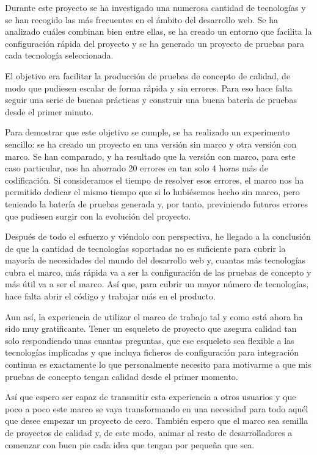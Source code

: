 Durante este proyecto se ha investigado una numerosa cantidad de tecnologías y se han recogido las más frecuentes en el ámbito del desarrollo web. Se ha analizado cuáles combinan bien entre ellas, se ha creado un entorno que facilita la configuración rápida del proyecto y se ha generado un proyecto de pruebas para cada tecnología seleccionada.

El objetivo era facilitar la producción de pruebas de concepto de calidad, de modo que pudiesen escalar de forma rápida y sin errores. Para eso hace falta seguir una serie de buenas prácticas y construir una buena batería de pruebas desde el primer minuto.

Para demostrar que este objetivo se cumple, se ha realizado un experimento sencillo: se ha creado un proyecto en una versión sin marco y otra versión con marco. Se han comparado, y ha resultado que la versión con marco, para este caso particular, nos ha ahorrado 20 errores en tan solo 4 horas más de codificación. Si consideramos el tiempo de resolver esos errores, el marco nos ha permitido dedicar el mismo tiempo que si lo hubiésemos hecho sin marco, pero teniendo la batería de pruebas generada y, por tanto, previniendo futuros errores que pudiesen surgir con la evolución del proyecto.

Después de todo el esfuerzo y viéndolo con perspectiva, he llegado a la conclusión de que la cantidad de tecnologías soportadas no es suficiente para cubrir la mayoría de necesidades del mundo del desarrollo web y, cuantas más tecnologías cubra el marco, más rápida va a ser la configuración de las pruebas de concepto y más útil va a ser el marco. Así que, para cubrir un mayor número de tecnologías, hace falta abrir el código y trabajar más en el producto.

Aun así, la experiencia de utilizar el marco de trabajo tal y como está ahora ha sido muy gratificante. Tener un esqueleto de proyecto que asegura calidad tan solo respondiendo unas cuantas preguntas, que ese esqueleto sea flexible a las tecnologías implicadas y que incluya ficheros de configuración para integración continua es exactamente lo que personalmente necesito para motivarme a que mis pruebas de concepto tengan calidad desde el primer momento.

Así que espero ser capaz de transmitir esta experiencia a otros usuarios y que poco a poco este marco se vaya transformando en una necesidad para todo aquél que desee empezar un proyecto de cero. También espero que el marco sea semilla de proyectos de calidad y, de este modo, animar al resto de desarrolladores a comenzar con buen pie cada idea que tengan por pequeña que sea.
